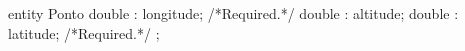 entity Ponto {
     double : longitude;   /*Required.*/
     double : altitude;
     double : latitude;   /*Required.*/
};